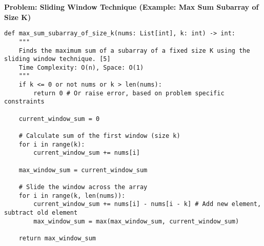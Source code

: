 \noindent\textbf{Problem: Sliding Window Technique (Example: Max Sum Subarray of Size K)}
\begin{verbatim}
def max_sum_subarray_of_size_k(nums: List[int], k: int) -> int:
    """
    Finds the maximum sum of a subarray of a fixed size K using the sliding window technique. [5]
    Time Complexity: O(n), Space: O(1)
    """
    if k <= 0 or not nums or k > len(nums):
        return 0 # Or raise error, based on problem specific constraints
    
    current_window_sum = 0
    
    # Calculate sum of the first window (size k)
    for i in range(k):
        current_window_sum += nums[i]
    
    max_window_sum = current_window_sum
    
    # Slide the window across the array
    for i in range(k, len(nums)):
        current_window_sum += nums[i] - nums[i - k] # Add new element, subtract old element
        max_window_sum = max(max_window_sum, current_window_sum)
        
    return max_window_sum
\end{verbatim}

